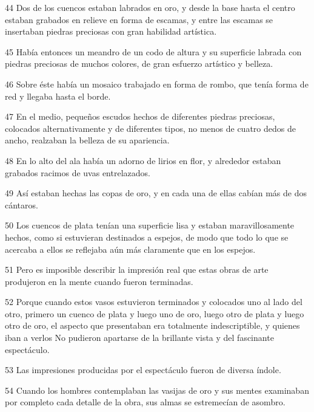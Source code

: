 \par 44 Dos de los cuencos estaban labrados en oro, y desde la base hasta el centro estaban grabados en relieve en forma de escamas, y entre las escamas se insertaban piedras preciosas con gran habilidad artística.

\par 45 Había entonces un meandro de un codo de altura y su superficie labrada con piedras preciosas de muchos colores, de gran esfuerzo artístico y belleza.

\par 46 Sobre éste había un mosaico trabajado en forma de rombo, que tenía forma de red y llegaba hasta el borde.

\par 47 En el medio, pequeños escudos hechos de diferentes piedras preciosas, colocados alternativamente y de diferentes tipos, no menos de cuatro dedos de ancho, realzaban la belleza de su apariencia.

\par 48 En lo alto del ala había un adorno de lirios en flor, y alrededor estaban grabados racimos de uvas entrelazados.

\par 49 Así estaban hechas las copas de oro, y en cada una de ellas cabían más de dos cántaros.

\par 50 Los cuencos de plata tenían una superficie lisa y estaban maravillosamente hechos, como si estuvieran destinados a espejos, de modo que todo lo que se acercaba a ellos se reflejaba aún más claramente que en los espejos.

\par 51 Pero es imposible describir la impresión real que estas obras de arte produjeron en la mente cuando fueron terminadas.

\par 52 Porque cuando estos vasos estuvieron terminados y colocados uno al lado del otro, primero un cuenco de plata y luego uno de oro, luego otro de plata y luego otro de oro, el aspecto que presentaban era totalmente indescriptible, y quienes iban a verlos No pudieron apartarse de la brillante vista y del fascinante espectáculo.

\par 53 Las impresiones producidas por el espectáculo fueron de diversa índole.

\par 54 Cuando los hombres contemplaban las vasijas de oro y sus mentes examinaban por completo cada detalle de la obra, sus almas se estremecían de asombro.

